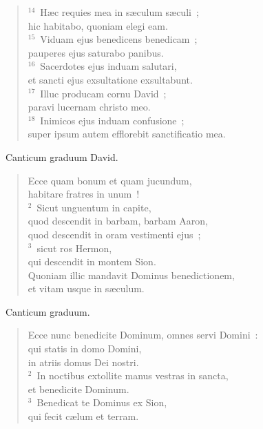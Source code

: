 \begin{flushleft}
\begin{verse}
${}^{14}$~H\ae c requies mea in s\ae culum s\ae culi~;\\ hic habitabo, quoniam elegi eam.\\
${}^{15}$~Viduam ejus benedicens benedicam~;\\ pauperes ejus saturabo panibus.\\
${}^{16}$~Sacerdotes ejus induam salutari,\\ et sancti ejus exsultatione exsultabunt.\\
${}^{17}$~Illuc producam cornu David~;\\ paravi lucernam christo meo.\\
${}^{18}$~Inimicos ejus induam confusione~;\\ super ipsum autem efflorebit sanctificatio mea.\end{verse}\end{flushleft}


~\lettrine[lines=10,image=true,loversize=0.05,lraise=-0.03]{C}{}anticum graduum David. \begin{flushleft}\begin{verse}\vspace{6pt}Ecce quam bonum et quam jucundum,\\ habitare fratres in unum~!\\
${}^{2}$~Sicut unguentum in capite,\\ quod descendit in barbam, barbam Aaron,\\ quod descendit in oram vestimenti ejus~;\\
${}^{3}$~sicut ros Hermon,\\ qui descendit in montem Sion.\\ Quoniam illic mandavit Dominus benedictionem,\\ et vitam usque in s\ae culum.\end{verse}\end{flushleft}


~\lettrine[lines=10,image=true,loversize=0.05,lraise=-0.03]{C}{}anticum graduum. \begin{flushleft}\begin{verse}\vspace{6pt}Ecce nunc benedicite Dominum, omnes servi Domini~:\\ qui statis in domo Domini,\\ in atriis domus Dei nostri.\\
${}^{2}$~In noctibus extollite manus vestras in sancta,\\ et benedicite Dominum.\\
${}^{3}$~Benedicat te Dominus ex Sion,\\ qui fecit c\ae lum et terram.\end{verse}\end{flushleft}


